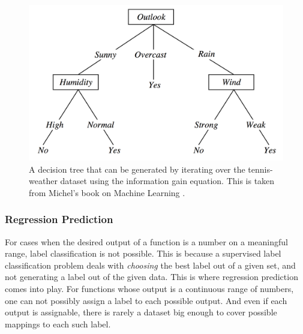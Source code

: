 \begin{figure}
\centering
\includegraphics[width=0.7\linewidth]{figures/tennis_decision_tree_mitchel.png}
\caption{A decision tree that can be generated by iterating over the tennis-weather dataset using the information gain equation. This is taken from Michel's book on Machine Learning \cite{mitchell1997machine}.}
\label{fig:decision_tree_for_tennis}
\end{figure}



\subsubsection{Regression Prediction}
\label{sec:regression_supervised_learning}
For cases when the desired output of a function is a number on a meaningful range, label classification is not possible. This is because a supervised label classification problem deals with \textit{choosing} the best label out of a given set, and not generating a label out of the given data. This is where regression prediction comes into play. For functions whose output is a continuous range of numbers, one can not possibly assign a label to each possible output. And even if each output is assignable, there is rarely a dataset big enough to cover possible mappings to each such label.


